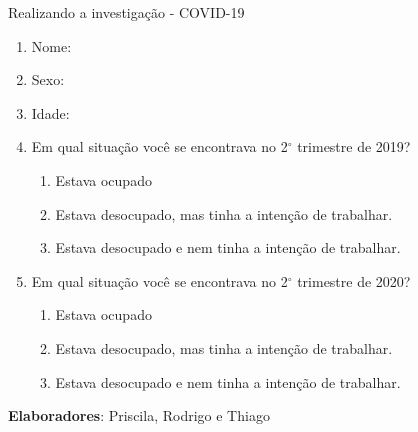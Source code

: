 \begin{example}{Realizando a investigação - COVID-19}
\begin{center}
{{	\begin{enumerate}[label=\textbf{\arabic*. }, itemsep=0cm]
	\item Nome:
	\item Sexo:
	\item Idade:
	\item Em qual situação você se encontrava no 2$^{\circ}$ trimestre de 2019?
	\begin{enumerate}[label=(\alph*)]
	\item Estava ocupado
	\item Estava desocupado, mas tinha a intenção de trabalhar.
	\item Estava desocupado e nem tinha a intenção de trabalhar.
	\end{enumerate}
	\item Em qual situação você se encontrava no 2$^{\circ}$ trimestre de 2020?
	\begin{enumerate}[label=(\alph*)]
	\item Estava ocupado
	\item Estava desocupado, mas tinha a intenção de trabalhar.
	\item Estava desocupado e nem tinha a intenção de trabalhar.
	\end{enumerate}
	\end{enumerate}
	\flushright

	\textbf{Elaboradores}: Priscila, Rodrigo e Thiago
	\vspace{.5em}
	}

}
\end{center}
\end{example}
\clearpage
